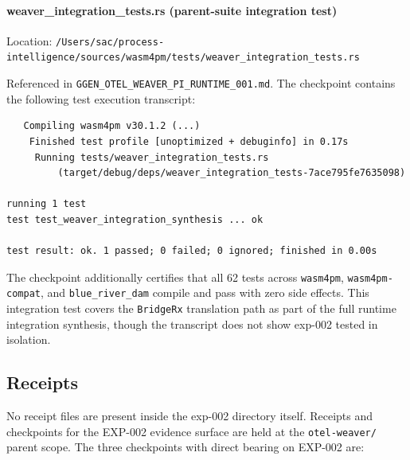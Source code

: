 \paragraph{weaver\_integration\_tests.rs (parent-suite integration test)}
Location: \texttt{/Users/sac/process-intelligence/sources/wasm4pm/tests/weaver\_integration\_tests.rs}

Referenced in \texttt{GGEN\_OTEL\_WEAVER\_PI\_RUNTIME\_001.md}. The checkpoint
contains the following test execution transcript:
\begin{verbatim}
   Compiling wasm4pm v30.1.2 (...)
    Finished test profile [unoptimized + debuginfo] in 0.17s
     Running tests/weaver_integration_tests.rs
         (target/debug/deps/weaver_integration_tests-7ace795fe7635098)

running 1 test
test test_weaver_integration_synthesis ... ok

test result: ok. 1 passed; 0 failed; 0 ignored; finished in 0.00s
\end{verbatim}

The checkpoint additionally certifies that all 62 tests across \texttt{wasm4pm},
\texttt{wasm4pm-compat}, and \texttt{blue\_river\_dam} compile and pass with zero
side effects. This integration test covers the \texttt{BridgeRx} translation path
as part of the full runtime integration synthesis, though the transcript does not
show exp-002 tested in isolation.

\subsection{Receipts}
\label{sec:otel-weaver-exp-002-diff-to-residual-evidence-receipts}

No receipt files are present inside the exp-002 directory itself. Receipts and
checkpoints for the EXP-002 evidence surface are held at the
\texttt{otel-weaver/} parent scope. The three checkpoints with direct bearing on
EXP-002 are:

